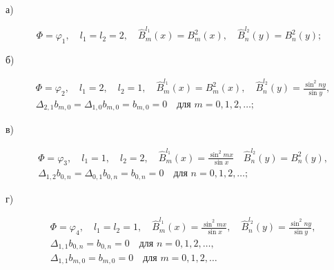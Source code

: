  


\noindent а) 


$$ 


\Phi=\varphi_1,\quad l_1=l_2=2, \quad 


\widehat B_m^{l_1}(x)=B_m^2(x),\quad 


\widehat B_n^{l_2}(y)=B_n^2(y); 


$$ 


 


\noindent б) 


\begin{align*} 


& \Phi=\varphi_2,\quad l_1=2, \quad l_2=1, \quad 


\widehat B_m^{l_1}(x)=B_m^2(x),\quad 


\widehat B_n^{l_2}(y)=\frac{\sin^2ny}{\sin y}, \\ 


& \Delta_{2,1}b_{m,0}=\Delta_{1,0}b_{m,0}=b_{m,0}=0 \quad


\text{для }m=0,1,2,\dotsc; 


\end{align*} 


 


\noindent в) 


\begin{align*} 


& \Phi=\varphi_3,\quad l_1=1, \quad l_2=2, \quad 


\widehat B_m^{l_1}(x)=\frac{\sin^2mx}{\sin x}\quad 


\widehat B_n^{l_2}(y)=B^2_n(y), \\ 


& \Delta_{1,2}b_{0,n}=\Delta_{0,1}b_{0,n}=b_{0,n}=0 \quad


\text{для }n=0,1,2,\dotsc; 


\end{align*} 


 


\noindent г) 


\begin{align*} 


& \Phi=\varphi_4,\quad l_1=l_2=1, \quad 


\widehat B_m^{l_1}(x)=\frac{\sin^2mx}{\sin x},\quad 


\widehat B_n^{l_2}(y)=\frac{\sin^2ny}{\sin y}, \\ 


& \Delta_{1,1}b_{0,n}=b_{0,n}=0 \quad


\text{для }n=0,1,2,\dotsc, \\ 


& \Delta_{1,1}b_{m,0}=b_{m,0}=0 \quad


\text{для }m=0,1,2,\dotsc


\end{align*} 



